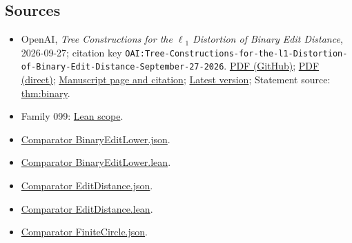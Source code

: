 \documentclass[11pt]{article}
\begin{document}
\subsection{Sources}
\begin{itemize}
\item OpenAI, \emph{Tree Constructions for the \(\ell\)\({}_{1}\) Distortion of Binary Edit Distance}, 2026-09-27; citation key \texttt{OAI:Tree-Constructions-for-the-l1-Distortion-of-Binary-Edit-Distance-September-27-2026}. \href{https://github.com/openai/math/blob/adc7f1241b42e322a6451854ab7e4b4c146bf78a/preprints/Tree-Constructions-for-the-l1-Distortion-of-Binary-Edit-Distance-September-27-2026/paper.pdf}{PDF (GitHub)}; \href{https://github.com/openai/math/raw/adc7f1241b42e322a6451854ab7e4b4c146bf78a/preprints/Tree-Constructions-for-the-l1-Distortion-of-Binary-Edit-Distance-September-27-2026/paper.pdf}{PDF (direct)}; \href{https://github.com/openai/math/blob/adc7f1241b42e322a6451854ab7e4b4c146bf78a/preprints/Tree-Constructions-for-the-l1-Distortion-of-Binary-Edit-Distance-September-27-2026/README.md}{Manuscript page and citation}; \href{https://github.com/openai/math/blob/main/preprints/Tree-Constructions-for-the-l1-Distortion-of-Binary-Edit-Distance-September-27-2026/paper.pdf}{Latest version}; Statement source: \href{https://github.com/openai/math/blob/adc7f1241b42e322a6451854ab7e4b4c146bf78a/preprints/Tree-Constructions-for-the-l1-Distortion-of-Binary-Edit-Distance-September-27-2026/build/sections/introduction.tex\#L36}{thm:binary}.
\item Family 099: \href{https://github.com/openai/math/blob/adc7f1241b42e322a6451854ab7e4b4c146bf78a/lean/docs/099.md}{Lean scope}.
\item \href{https://github.com/openai/math/blob/adc7f1241b42e322a6451854ab7e4b4c146bf78a/lean/ComparatorChallenges/BinaryEditLower.json}{Comparator BinaryEditLower.json}.
\item \href{https://github.com/openai/math/blob/adc7f1241b42e322a6451854ab7e4b4c146bf78a/lean/ComparatorChallenges/BinaryEditLower.lean}{Comparator BinaryEditLower.lean}.
\item \href{https://github.com/openai/math/blob/adc7f1241b42e322a6451854ab7e4b4c146bf78a/lean/ComparatorChallenges/EditDistance.json}{Comparator EditDistance.json}.
\item \href{https://github.com/openai/math/blob/adc7f1241b42e322a6451854ab7e4b4c146bf78a/lean/ComparatorChallenges/EditDistance.lean}{Comparator EditDistance.lean}.
\item \href{https://github.com/openai/math/blob/adc7f1241b42e322a6451854ab7e4b4c146bf78a/lean/ComparatorChallenges/FiniteCircle.json}{Comparator FiniteCircle.json}.

\end{itemize}
\end{document}
